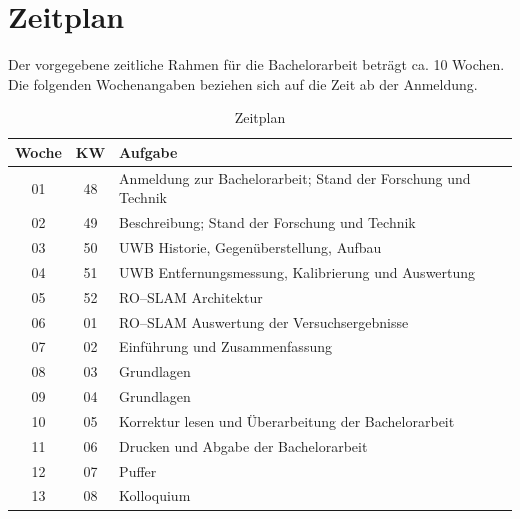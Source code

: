 \documentclass[12pt]{article}
\begin{document}
%
%
\section{Zeitplan}
Der vorgegebene zeitliche Rahmen für die Bachelorarbeit beträgt ca. 10 Wochen. Die folgenden Wochenangaben beziehen sich auf die Zeit ab der Anmeldung.

\begin{table}[h!]
	\centering
	\begin{tabular}{||c|c||l||}
		\hline
		Woche & KW & Aufgabe\\	\hline\hline
		01 & 48 & Anmeldung zur Bachelorarbeit; Stand der Forschung und Technik\\\hline
		02 & 49 & Beschreibung; Stand der Forschung und Technik \\\hline
		03 & 50 & UWB Historie, Gegenüberstellung, Aufbau\\\hline
		04 & 51 & UWB Entfernungsmessung, Kalibrierung und Auswertung\\\hline
		05 & 52 & RO--SLAM Architektur\\\hline
		06 & 01 & RO--SLAM Auswertung der Versuchsergebnisse\\\hline
		07 & 02 & Einführung und Zusammenfassung\\\hline
		08 & 03 & Grundlagen\\\hline
		09 & 04 & Grundlagen\\\hline
		10 & 05 & Korrektur lesen und Überarbeitung der Bachelorarbeit\\\hline\hline
		11 & 06 & Drucken und Abgabe der Bachelorarbeit\\\hline
		12 & 07 & Puffer \\\hline
		13 & 08 & Kolloquium \\\hline
	\end{tabular}
	\caption{Zeitplan}
	\label{table:zeitplan}
\end{table}


%
\newpage
\nocite{mcelroy2014comparison}
\nocite{herranz2014comparison}
\nocite{gonzalez2009mobile}
\nocite{durrant2006simultaneous}
\nocite{thrun2005probabilistic}
\nocite{schroeder2005low}
\nocite{smith2004tracking}
\printbibliography[heading=bibnumbered]
\end{document}
